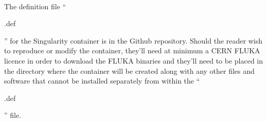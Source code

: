 \paragraph{}
The definition file ``\begin{tt}.def\end{tt}'' for the Singularity container is in the Github repository. Should the reader wish to reproduce or modify the container, they'll need at minimum a CERN FLUKA licence in order to download the FLUKA binaries and they'll need to be placed in the directory where the container will be created along with any other files and software that cannot be installed separately from within the ``\begin{tt}.def\end{tt}'' file.